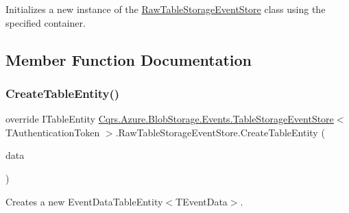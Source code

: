 Initializes a new instance of the \hyperlink{classCqrs_1_1Azure_1_1BlobStorage_1_1Events_1_1TableStorageEventStore_1_1RawTableStorageEventStore}{Raw\+Table\+Storage\+Event\+Store} class using the specified container. 



\subsection{Member Function Documentation}
\mbox{\label{classCqrs_1_1Azure_1_1BlobStorage_1_1Events_1_1TableStorageEventStore_1_1RawTableStorageEventStore_a916cc6bc33379535690aa0c2e7e90554_a916cc6bc33379535690aa0c2e7e90554}} 
\subsubsection{\texorpdfstring{Create\+Table\+Entity()}{CreateTableEntity()}}
{\footnotesize\ttfamily override I\+Table\+Entity \hyperlink{classCqrs_1_1Azure_1_1BlobStorage_1_1Events_1_1TableStorageEventStore}{Cqrs.\+Azure.\+Blob\+Storage.\+Events.\+Table\+Storage\+Event\+Store}$<$ T\+Authentication\+Token $>$.Raw\+Table\+Storage\+Event\+Store.\+Create\+Table\+Entity (\begin{DoxyParamCaption}\item[{\hyperlink{classCqrs_1_1Events_1_1EventData}{Event\+Data}}]{data }\end{DoxyParamCaption})\hspace{0.3cm}{\ttfamily [protected]}}



Creates a new Event\+Data\+Table\+Entity$<$\+T\+Event\+Data$>$. 

